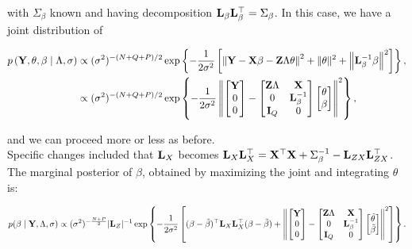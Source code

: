 \documentclass[10pt]{article}
\begin{document}
\noindent with $\Sigma_\beta$ known and having decomposition ${\bf L}_\beta{\bf
  L}_\beta^\top = \Sigma_\beta$. In this case, we have a joint
distribution of

\begin{align*}
p\left({\bf Y}, \theta, \beta \mid \Lambda, \sigma\right) & \propto
(\sigma^2)^{-(N+Q+P)/2}\exp\left\{
-\frac{1}{2\sigma^2}\left[\left\|
{\bf Y} - {\bf X}\beta - {\bf Z}\Lambda\theta\right\|^2 + \|\theta\|^2
+ \left\|{\bf L}_\beta^{-1}\beta\right\|^2
\right]\right\}, \\
& \propto (\sigma^2)^{-(N+Q+P)/2}
\exp\left\{-\frac{1}{2\sigma^2}
\left\|
\begin{bmatrix}{\bf Y} \\ 0 \\ 0 \end{bmatrix} -
\begin{bmatrix}{\bf Z}\Lambda & {\bf X} \\
0 & {\bf L}_\beta^{-1} \\
{\bf I}_Q & 0
\end{bmatrix}
\begin{bmatrix} \theta \\ \beta \end{bmatrix}
\right\|^2\right\},
\end{align*}

\noindent and we can proceed more or less as before. \\

Specific changes included that ${\bf L}_X$
becomes ${\bf L}_X{\bf L}_X^\top = {\bf X}^\top{\bf X} +
\Sigma_\beta^{-1} - {\bf L}_{ZX}{\bf L}_{ZX}^\top$. The marginal
posterior of $\beta$, obtained by maximizing the joint and integrating
$\theta$ is:

\begin{equation*}
p(\beta \mid {\bf Y},  \Lambda, \sigma) \propto
(\sigma^2)^{-\frac{N+P}{2}}|{\bf L}_Z|^{-1}
\exp\left\{-\frac{1}{2\sigma^2}\left[(\beta - \tilde\beta)^\top{\bf L}_X{\bf
    L}_X^\top(\beta - \tilde\beta) +
\left\|
\begin{bmatrix}{\bf Y} \\ 0 \\ 0 \end{bmatrix} -
\begin{bmatrix}{\bf Z}\Lambda & {\bf X} \\
0 & {\bf L}_\beta^{-1} \\
{\bf I}_Q & 0
\end{bmatrix}
\begin{bmatrix} \tilde\theta \\ \tilde\beta \end{bmatrix}
\right\|^2\right]
\right\}.
\end{equation*}
\end{document}
